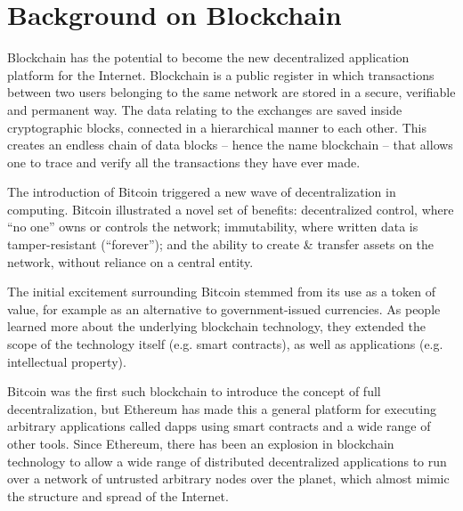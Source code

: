 \section{Background on Blockchain}\label{sec:blockchain}

Blockchain has the potential to become the new decentralized application platform for the Internet. Blockchain is a
public register in which transactions between two users belonging to the same network are stored in a secure, verifiable
and permanent way. The data relating to the exchanges are saved inside cryptographic blocks, connected in a hierarchical
manner to each other. This creates an endless chain of data blocks -- hence the name blockchain -- that allows one to
trace and verify all the transactions they have ever made.

The introduction of Bitcoin \cite{nakamoto2009bitcoin} triggered a new wave of decentralization in computing.
Bitcoin illustrated a novel set of benefits: decentralized control, where ``no one'' owns or controls the network;
immutability, where written data is tamper-resistant (``forever''); and the ability to create \& transfer assets on the
network, without reliance on a central entity.

The initial excitement surrounding Bitcoin stemmed from its use as a token of value, for example as an alternative to
government-issued currencies.  As people learned more about the underlying blockchain technology, they extended the
scope of the technology itself (e.g. smart contracts), as well as applications (e.g. intellectual property).

Bitcoin was the first such blockchain to introduce the concept of full decentralization, but Ethereum has made this a
general platform for executing arbitrary applications called dapps using smart contracts and a wide range of other
tools. Since Ethereum, there has been an explosion in blockchain technology to allow a wide range of distributed
decentralized applications to run over a network of untrusted arbitrary nodes over the planet, which almost mimic the
structure and spread of the Internet.


